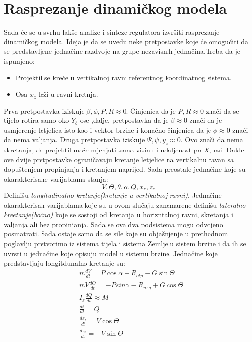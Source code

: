 \section{Rasprezanje dinamičkog modela}
Sada će se u svrhu lakše analize i sinteze regulatora izvršiti rasprezanje dinamičkog modela. Ideja je 
da se uvedu neke pretpostavke koje će omogućiti da se predstavljene jednačine razdvoje na grupe 
nezavisnih jednačina.Treba da je ispunjeno:
\begin{itemize}
    \item Projektil se kreće u vertikalnoj ravni referentnog koordinatnog sistema.
    \item Osa $x_z$ leži u ravni kretnja.
\end{itemize}
Prva pretpostavka iziskuje $\beta , \phi , P, R\approx 0$. Činjenica da je $P,R \approx 0$ znači da se tijelo rotira samo oko $Y_b$ ose
,dalje, pretpostavka da je $\beta \approx 0$ znači da je usmjerenje letjelica isto kao i vektor brzine i konačno činjenica 
da je $\phi \approx 0$ znači da nema valjanja.  
Druga pretpostavka iziskuje $\Psi, \psi, y_z\approx 0$. Ovo znači da nema skretanja, da projektil može mjenjati samo visinu i udaljenost po $X_z$ osi.
Dakle ove dvije pretpostavke ograničavaju kretanje letjelice na vertikalnu ravan sa dopuštenjem propinjanja i kretanjem naprijed. 
Sada preostale jednačine koje su okarakterisane varijablama stanja:
\[V,\Theta,\theta,\alpha,Q,x_z, z_z\]
Definišu \textit{longitudinalno kretanje(kretanje u vertikalnoj ravni)}. Jednačine okarakterisan varijablama 
koje su u ovom slučaju zanemarene definišu \textit{lateralno kreetanje(bočno)} koje se sastoji 
od kretanja u horizntalnoj ravni, skretanja i valjanja ali bez propinjanja. Sada se ova dva podsistema mogu odvojeno posmatrati.
Sada ostaje samo da se sile koje su objašnjenje u prethodnom poglavlju pretvorimo iz sistema tijela 
i sistema Zemlje u sistem brzine i da ih se uvrsti u jednačine koje opisuju model u sistemu brzine. 
Jednačine koje predstavljaju longitdunalno kretanje su:
\begin{align}
    &m\frac{dV}{dt}= P\cos\alpha - R_{otp} - G\sin\Theta\\
    &mV\frac{d\Theta}{dt} = -Psin\alpha - R_{uzg} + G\cos\Theta\\
    &I_x\frac{dQ}{dt} \approx M\\
    &\frac{d\theta}{dt}=Q\\
    &\frac{dx_z}{dt}=V\cos\Theta\\
    &\frac{dz_z}{dt}=-V\sin\Theta
\end{align}
